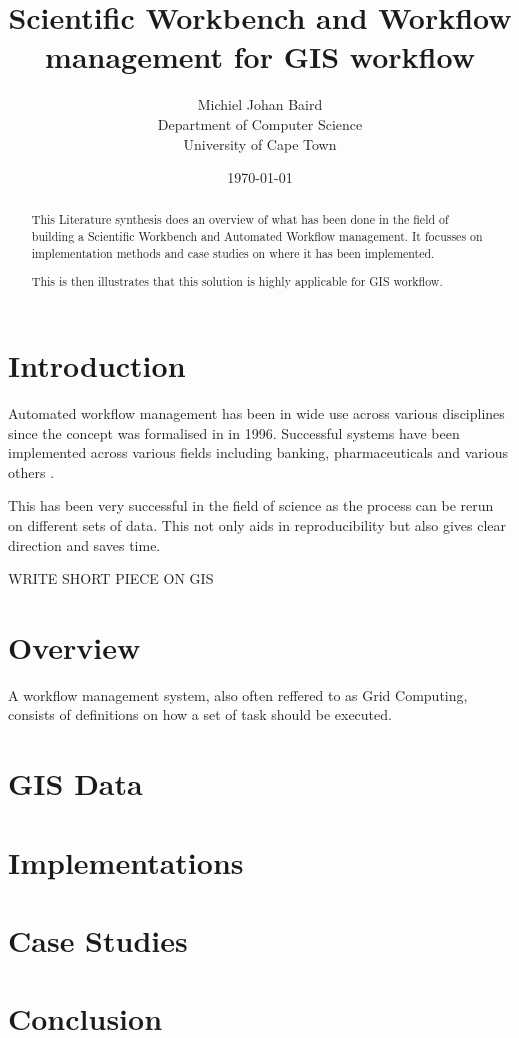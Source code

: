 \documentclass[11pt,twocolumn]{article}
\title{Scientific Workbench and Workflow management for GIS workflow}
\author{
    Michiel Johan Baird \\
        Department of Computer Science \\
        University of Cape Town
}
\date{\today}
\begin{document}
\maketitle
\begin{abstract}
    This Literature synthesis does an overview of what has been done
    in the field of building a Scientific Workbench and Automated
    Workflow management. It focusses on implementation methods and
    case studies on where it has been implemented.

    This is then illustrates that this solution is highly applicable
    for GIS workflow.
\end{abstract}
\section{Introduction}
    Automated workflow management has been in wide use across
    various disciplines since the concept was formalised in in
    1996\cite{springerlink:10.1007/BF00136712}. Successful systems
    have been implemented across various fields including banking,
    pharmaceuticals and various others
    \cite{Brahe:2007:SWW:1316624.1316661,5407993}.

    This has been very successful in the field of science as
    the process can be rerun on different sets of data.\cite{4721191}
    This not only aids in reproducibility but also gives
    clear direction and saves time.

    WRITE SHORT PIECE ON GIS

\section{Overview}
    A workflow management system, also often reffered to as
    Grid Computing, consists of definitions on how a set of
    task should be executed\cite{springerlink:10.1007/BF00136712}.





\section{GIS Data}

\section{Implementations}

\section{Case Studies}

\section{Conclusion}


{}

\end{document}
